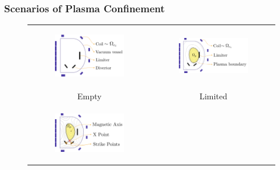 \documentclass{beamer}
\begin{document}
\begin{frame}[t]
\frametitle{Scenarios of Plasma Confinement}
    
\vspace{-2mm}

\begin{figure}[H]	
    \centering
    \hspace{10mm}
    \begin{tabular}{cc}
        \begin{subfigure}{0.4\textwidth}
            \includegraphics[height=0.45\linewidth]{BasicConfig}
        \end{subfigure}
        &
        \begin{subfigure}{0.4\textwidth}
            \includegraphics[height=0.45\linewidth]{Limiter}
        \end{subfigure}\\
        Empty & Limited\\ [1ex]
        \begin{subfigure}{0.4\textwidth}
            \includegraphics[height=0.45\linewidth]{StrikePoint}

\end{subfigure}
\end{tabular}
\end{figure}
\end{frame}
\end{document}
